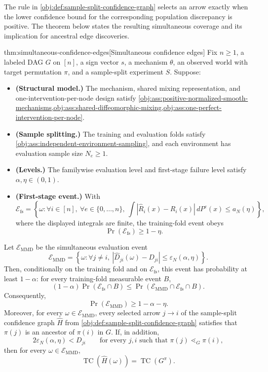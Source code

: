 The rule in \cref{obj:def:sample-split-confidence-graph} selects an arrow exactly when the lower confidence bound for the corresponding population discrepancy is positive. The theorem below states the resulting simultaneous coverage and its implication for ancestral edge discoveries.

\begin{theoremv}{thm:simultaneous-confidence-edges}[Simultaneous confidence edges]
Fix \(n\ge 1\), a labeled DAG \(G\) on \([n]\), a sign vector \(s\), a mechanism \(\theta\), an observed world with target permutation \(\pi\), and a sample-split experiment \(S\). Suppose:
\begin{itemize}
\item \textbf{(Structural model.)} The mechanism, shared mixing representation, and one-intervention-per-node design satisfy \cref{obj:ass:positive-normalized-smooth-mechanisms,obj:ass:shared-diffeomorphic-mixing,obj:ass:one-perfect-intervention-per-node}.
\item \textbf{(Sample splitting.)} The training and evaluation folds satisfy \cref{obj:ass:independent-environment-sampling}, and each environment has evaluation sample size \(N_e\ge 1\).
\item \textbf{(Levels.)} The familywise evaluation level and first-stage failure level satisfy \(\alpha,\eta\in(0,1)\).
\item \textbf{(First-stage event.)} With
\[
\mathcal E_{\mathrm{fs}}
=
\left\{
\omega:
\forall i\in[n],\ \forall e\in\{0,\ldots,n\},\
\int
\left|\widehat R_i(x)-R_i(x)\right|
\,dP^e(x)
\le a_N(\eta)
\right\},
\]
where the displayed integrals are finite, the training-fold event obeys
\[
\Pr(\mathcal E_{\mathrm{fs}})\ge 1-\eta .
\]
\end{itemize}
Let \(\mathcal E_{\mathrm{MMD}}\) be the simultaneous evaluation event
\[
\mathcal E_{\mathrm{MMD}}
=
\left\{
\omega:
\forall j\ne i,\
\left|\widehat D_{ji}(\omega)-D_{ji}\right|
\le \varepsilon_N(\alpha,\eta)
\right\}.
\]
Then, conditionally on the training fold and on \(\mathcal E_{\mathrm{fs}}\), this event has probability at least \(1-\alpha\): for every training-fold measurable event \(B\),
\[
(1-\alpha)\Pr(\mathcal E_{\mathrm{fs}}\cap B)
\le
\Pr(\mathcal E_{\mathrm{MMD}}\cap\mathcal E_{\mathrm{fs}}\cap B).
\]
Consequently,
\[
\Pr(\mathcal E_{\mathrm{MMD}})\ge 1-\alpha-\eta .
\]
Moreover, for every \(\omega\in\mathcal E_{\mathrm{MMD}}\), every selected arrow \(j\to i\) of the sample-split confidence graph \(\widehat H\) from \cref{obj:def:sample-split-confidence-graph} satisfies that \(\pi(j)\) is an ancestor of \(\pi(i)\) in \(G\). If, in addition,
\[
2\varepsilon_N(\alpha,\eta)<D_{ji}
\qquad
\text{for every }j,i\text{ such that }\pi(j)\lessdot_G \pi(i),
\]
then for every \(\omega\in\mathcal E_{\mathrm{MMD}}\),
\[
\operatorname{TC}\!\left(\widehat H(\omega)\right)
=
\operatorname{TC}\!\left(G^\pi\right).
\]
\end{theoremv}

